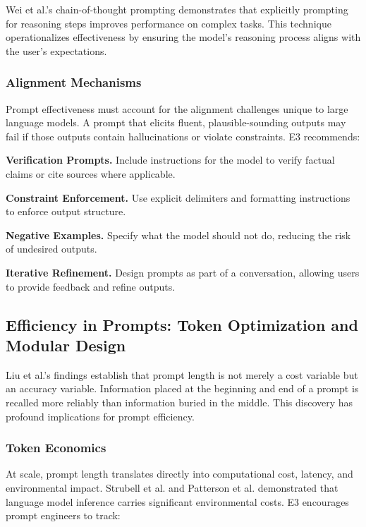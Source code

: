 \documentclass[11pt,a4paper]{article}
\begin{document}
Wei et al.'s chain-of-thought prompting \cite{wei2022chain} demonstrates that explicitly prompting for reasoning steps improves performance on complex tasks. This technique operationalizes effectiveness by ensuring the model's reasoning process aligns with the user's expectations.

\subsubsection{Alignment Mechanisms}

Prompt effectiveness must account for the alignment challenges unique to large language models. A prompt that elicits fluent, plausible-sounding outputs may fail if those outputs contain hallucinations or violate constraints. E3 recommends:

\textbf{Verification Prompts.} Include instructions for the model to verify factual claims or cite sources where applicable.

\textbf{Constraint Enforcement.} Use explicit delimiters and formatting instructions to enforce output structure.

\textbf{Negative Examples.} Specify what the model should not do, reducing the risk of undesired outputs.

\textbf{Iterative Refinement.} Design prompts as part of a conversation, allowing users to provide feedback and refine outputs.

\subsection{Efficiency in Prompts: Token Optimization and Modular Design}

Liu et al.'s findings \cite{liu2023lost} establish that prompt length is not merely a cost variable but an accuracy variable. Information placed at the beginning and end of a prompt is recalled more reliably than information buried in the middle. This discovery has profound implications for prompt efficiency.

\subsubsection{Token Economics}

At scale, prompt length translates directly into computational cost, latency, and environmental impact. Strubell et al. \cite{strubell2019energy} and Patterson et al. \cite{patterson2021carbon} demonstrated that language model inference carries significant environmental costs. E3 encourages prompt engineers to track:
\end{document}

